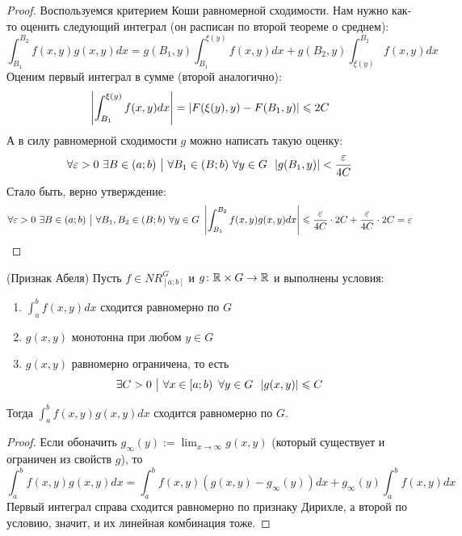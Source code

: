 \begin{proof}
	Воспользуемся критерием Коши равномерной сходимости. Нам нужно как-то оценить следующий интеграл (он расписан по второй теореме о среднем):
	\[
		\int_{B_1}^{B_2} f(x, y)g(x, y)dx = g(B_1, y) \int_{B_1}^{\xi(y)} f(x, y)dx + g(B_2, y) \int_{\xi(y)}^{B_2} f(x, y)dx
	\]
	Оценим первый интеграл в сумме (второй аналогично):
	\[
		\left|\int_{B_1}^{\xi(y)} f(x, y)dx\right| = |F(\xi(y), y) - F(B_1, y)| \leqslant 2C
	\]
	А в силу равномерной сходимости $g$ можно написать такую оценку:
	\[
		\forall \varepsilon > 0\ \exists B \in (a; b) \ \big|\  \forall B_1 \in (B; b) \ \forall y \in G\ \ |g(B_1, y)| < \frac{\varepsilon}{4C}
	\]
	Стало быть, верно утверждение:
	\[
		\forall \eps > 0\ \exists B \in (a; b) \such \forall B_1, B_2 \in (B; b) \ \forall y \in G \ \md{\int_{B_1}^{B_2} f(x, y)g(x, y)dx} \le \frac{\eps}{4C} \cdot 2C + \frac{\eps}{4C} \cdot 2C = \eps
	\]
\end{proof}

\begin{theorem} (Признак Абеля)
	Пусть $f \in NR_{[a; b]}^G$ и $g \colon \mathbb{R} \times G \to \mathbb{R}$ и выполнены условия:
	\begin{enumerate}
		\item $\int_a^b f(x, y)dx$ сходится равномерно по $G$
		
		\item $g(x, y)$ монотонна при любом $y \in G$
		
		\item $g(x, y)$ равномерно ограничена, то есть
		\[
			\exists C > 0 \ \big|\  \forall x \in \left[a; b\right)\ \forall y \in G\ \ |g(x, y)| \leqslant C
		\]
	\end{enumerate}
	Тогда $\int_a^b f(x, y)g(x, y)dx$ сходится равномерно по $G$.
\end{theorem}

\begin{proof}
	Если обоначить $g_{\infty}(y) := \lim_{x \to \infty}g(x, y)$ (который существует и ограничен из свойств $g$), то
	\[
		\int_a^b f(x, y)g(x, y)dx = \int_a^b f(x, y)(g(x, y) - g_{\infty}(y))dx + g_{\infty}(y) \! \int_a^b f(x, y)dx
	\]
	Первый интеграл справа сходится равномерно по признаку Дирихле, а второй по условию, значит, и их линейная комбинация тоже.
\end{proof}

